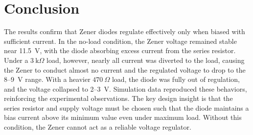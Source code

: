 \documentclass[12pt]{article}
\begin{document}
\section{Conclusion}
The results confirm that Zener diodes regulate effectively only when biased
with sufficient current. In the no-load condition, the Zener voltage remained
stable near 11.5~V, with the diode absorbing excess current from the series
resistor. Under a $3~\text{k}\Omega$ load, however, nearly all current was
diverted to the load, causing the Zener to conduct almost no current and the
regulated voltage to drop to the 8--9~V range. With a heavier $470~\Omega$ load,
the diode was fully out of regulation, and the voltage collapsed to 2--3~V.
Simulation data reproduced these behaviors, reinforcing the experimental
observations. The key design insight is that the series resistor and supply
voltage must be chosen such that the diode maintains a bias current above its
minimum value even under maximum load. Without this condition, the Zener cannot
act as a reliable voltage regulator.
\end{document}
